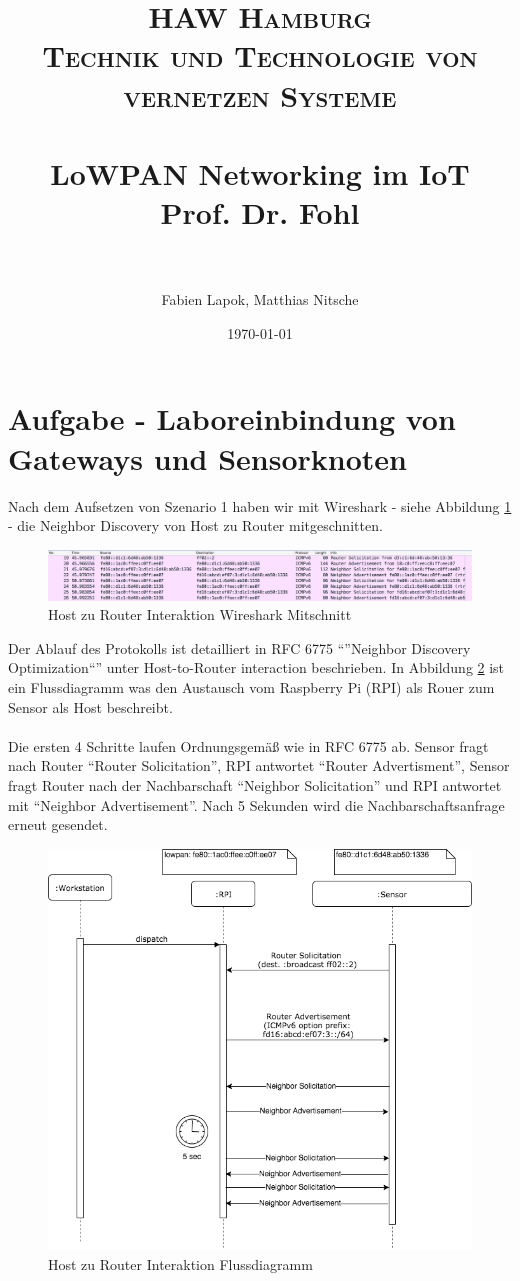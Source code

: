 \documentclass[paper=a4, fontsize=11pt]{scrartcl} %
\title {
  \normalfont \normalsize
  \textsc{HAW Hamburg} \\ [25pt] %
  \textsc{Technik und Technologie von vernetzen Systeme} \\ [15pt]
  \horrule{0.5pt} \\[0.4cm] %
  \huge LoWPAN Networking im IoT \\ [15pt] %
  \small Prof. Dr. Fohl \\
  \horrule{2pt} \\[0.5cm] %
}
\author{Fabien Lapok, Matthias Nitsche}
\date{\normalsize\today}
\numberwithin{equation}{section} %
\numberwithin{figure}{section} %
\numberwithin{table}{section} %
\begin{document}
\maketitle

\section{Aufgabe - Laboreinbindung von Gateways und Sensorknoten}

Nach dem Aufsetzen von Szenario 1 haben wir mit Wireshark - siehe Abbildung \ref{fig:hrwireshark} - die Neighbor Discovery von Host zu Router mitgeschnitten.

\begin{figure}[H]
  \centering
  \includegraphics[width=\linewidth]{imgs/host-to-router-interaction-wireshark.png}
  \caption{Host zu Router Interaktion Wireshark Mitschnitt}
  \label{fig:hrwireshark}
\end{figure}

Der Ablauf des Protokolls ist detailliert in RFC 6775 ``''Neighbor Discovery Optimization``'' unter Host-to-Router interaction beschrieben. In Abbildung \ref{fig:hrfluss} ist ein Flussdiagramm was den Austausch vom Raspberry Pi (RPI) als Rouer zum Sensor als Host beschreibt.
\\
\\
Die ersten 4 Schritte laufen Ordnungsgemäß wie in RFC 6775 ab. Sensor fragt nach Router ``Router Solicitation'', RPI antwortet ``Router Advertisment'', Sensor fragt Router nach der Nachbarschaft ``Neighbor Solicitation'' und RPI antwortet mit ``Neighbor Advertisement''. Nach 5 Sekunden wird die Nachbarschaftsanfrage erneut gesendet.

\begin{figure}[H]
  \centering
  \includegraphics[width=0.7\linewidth,height=0.7\columnwidth]{imgs/host-to-router-interaction.png}
  \caption{Host zu Router Interaktion Flussdiagramm}
  \label{fig:hrfluss}
\end{figure}
\end{document}
